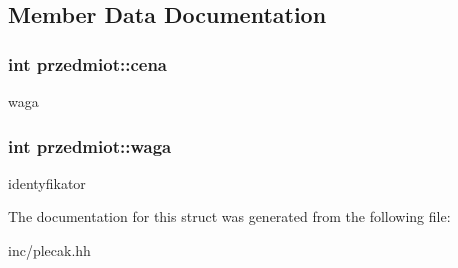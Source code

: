 \subsection{Member Data Documentation}
\hypertarget{structprzedmiot_a922b5033917598aa2c23af451fd542e7}{
\subsubsection[{cena}]{\setlength{\rightskip}{0pt plus 5cm}int przedmiot\-::cena}}\label{structprzedmiot_a922b5033917598aa2c23af451fd542e7}
waga \hypertarget{structprzedmiot_a5c9bc4d59e9de3879b5ac10b999bb6b9}{
\subsubsection[{waga}]{\setlength{\rightskip}{0pt plus 5cm}int przedmiot\-::waga}}\label{structprzedmiot_a5c9bc4d59e9de3879b5ac10b999bb6b9}
identyfikator 

The documentation for this struct was generated from the following file\-:\begin{DoxyCompactItemize}
\item 
inc/plecak.\-hh\end{DoxyCompactItemize}
